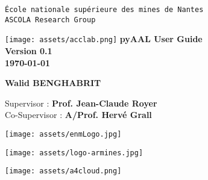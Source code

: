 \begin{titlepage}

\thispagestyle{empty}

\begin{center}
	\large{\texttt{École nationale supérieure des mines de Nantes}}\\
	\large{\texttt{ASCOLA Research Group}}
\end{center}

\noindent
\vspace{0.5cm}

\begin{center}
	\texttt{[image: assets/acclab.png]}
	\Huge{\textbf{pyAAL User Guide}} \\ \vspace{0.5cm} \large{\textbf{Version 0.1}} \\
	\vspace{0.4cm}
	\large{\textbf{\today}}
	\normalsize
	\vspace{4.0cm}

	\begin{center}
	  \textbf{Walid BENGHABRIT}
	\end{center}

	\vspace{2mm}
	Supervisor : \textbf{Prof. Jean-Claude Royer} \\
	Co-Supervisor : \textbf{A/Prof. Hervé Grall}

\end{center}

\vspace{4.5cm}
\parbox{0.33\linewidth}{ \texttt{[image: assets/enmLogo.jpg]}}
\parbox{0.33\linewidth}{ \texttt{[image: assets/logo-armines.jpg]}}
\parbox{0.33\linewidth}{ \texttt{[image: assets/a4cloud.png]}}	

\end{titlepage}